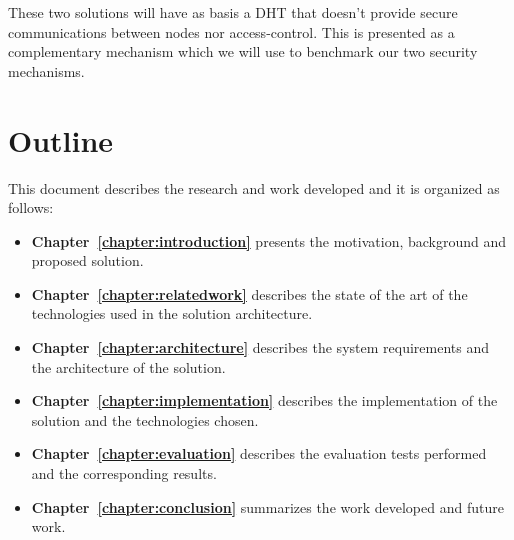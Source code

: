 These two solutions will have as basis a \ac{DHT} that doesn't provide secure communications between nodes nor access-control.
This is presented as a complementary mechanism which we will use to benchmark our two security mechanisms.

\section{Outline}
This document describes the research and work developed and it is organized as follows:

\begin{itemize}
  \item \textbf{Chapter~\ref{chapter:introduction}} presents the motivation, background and proposed solution.
  \item \textbf{Chapter~\ref{chapter:relatedwork}} describes the state of the art of the technologies used in the solution architecture.
  \item \textbf{Chapter~\ref{chapter:architecture}} describes the system requirements and the architecture of the solution.
  \item \textbf{Chapter~\ref{chapter:implementation}} describes the implementation of the solution and the technologies chosen.
  \item \textbf{Chapter~\ref{chapter:evaluation}} describes the evaluation tests performed and the corresponding results.
  \item \textbf{Chapter~\ref{chapter:conclusion}} summarizes the work developed and future work.
\end{itemize}

\cleardoublepage
